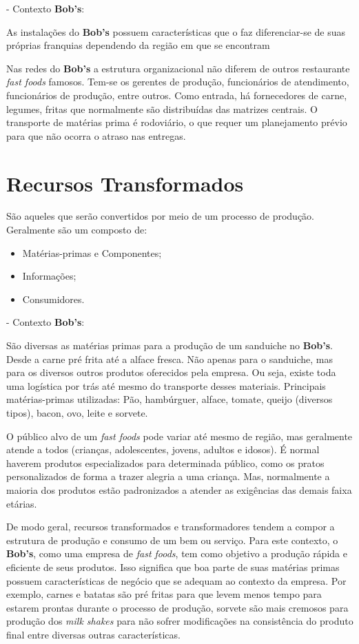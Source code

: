 		- Contexto \textbf{Bob’s}:

		As instalações do \textbf{Bob’s} possuem características que o faz diferenciar-se de suas próprias franquias dependendo da região em que se encontram
		
		Nas redes do \textbf{Bob’s} a estrutura organizacional não diferem de outros restaurante \emph{fast foods} famosos. Tem-se os gerentes de produção, funcionários de atendimento, funcionários de produção, entre outros. Como entrada, há fornecedores de carne, legumes, fritas que normalmente são distribuídas das matrizes centrais. O transporte de matérias prima é rodoviário, o que requer um planejamento prévio para que não ocorra o atraso nas entregas.


	\section[Recursos Transformados]{Recursos Transformados}
	\label{sec:dados_transformados}

		São aqueles que serão convertidos por meio de um processo de produção. Geralmente são um composto de: 

		\begin{itemize}
			\item{Matérias-primas e Componentes;}
			\item{Informações;}
			\item{Consumidores.}
		\end{itemize}
		
		- Contexto \textbf{Bob’s}:

		São diversas as matérias primas para a produção de um sanduiche no \textbf{Bob’s}. Desde a carne pré frita até a alface fresca. Não apenas para o sanduiche, mas para os diversos outros produtos oferecidos pela empresa. Ou seja, existe toda uma logística por trás até mesmo do transporte desses materiais. Principais matérias-primas utilizadas: Pão, hambúrguer, alface, tomate, queijo (diversos tipos), bacon, ovo, leite e sorvete.

		O público alvo de um \emph{fast foods} pode variar até mesmo de região, mas geralmente atende a todos (crianças, adolescentes, jovens, adultos e idosos). É normal haverem produtos especializados para determinada público, como os pratos personalizados de forma a trazer alegria a uma criança. Mas, normalmente a maioria dos produtos estão padronizados a atender as exigências das demais faixa etárias.

		De modo geral, recursos transformados e transformadores tendem a compor a estrutura de produção e consumo de um bem ou serviço. Para este contexto, o \textbf{Bob’s}, como uma empresa de \emph{fast foods}, tem como objetivo a produção rápida e eficiente de seus produtos. Isso significa que boa parte de suas matérias primas possuem características de negócio que se adequam ao contexto da empresa. Por exemplo, carnes e batatas são pré fritas para que levem menos tempo para estarem prontas durante o processo de produção, sorvete são mais cremosos para produção dos \emph{milk shakes} para não sofrer modificações na consistência do produto final entre diversas outras características.

